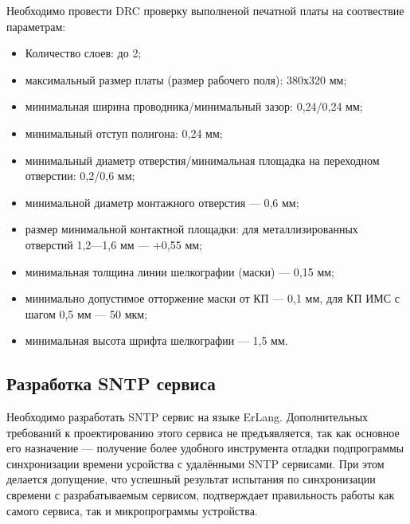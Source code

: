 \begin{par}
Необходимо провести DRC проверку выполненой печатной платы на соотвествие параметрам:
\begin{itemize}
    \item{} Количество слоев: до 2;
    \item{} максимальный размер платы (размер рабочего поля): 380х320 мм;
    \item{} минимальная ширина проводника/минимальный зазор: 0,24/0,24 мм;
    \item{} минимальный отступ полигона: 0,24 мм;
    \item{} минимальный диаметр отверстия/минимальная площадка на переходном отверстии: 0,2/0,6 мм;
    \item{} минимальной диаметр монтажного отверстия — 0,6 мм;
    \item{} размер минимальной контактной площадки: для металлизированных отверстий 1,2—1,6 мм — +0,55 мм;
    \item{} минимальная толщина линии шелкографии (маски) — 0,15 мм;
    \item{} минимально допустимое отторжение маски от КП — 0,1 мм, для КП ИМС с шагом 0,5 мм — 50 мкм;
    \item{} минимальная высота шрифта шелкографии — 1,5 мм.
\end{itemize}
\end{par}

\subsection{Разработка SNTP сервиса}
\begin{par}
Необходимо разработать SNTP сервис на языке ErLang. Дополнительных требований к проектированию этого сервиса
не предъявляется, так как основное его назначение --- получение более удобного
инструмента отладки подпрограммы синхронизации времени усройства с удалёнными SNTP сервисами.
При этом делается допущение, что успешный результат испытания по синхронизации свремени с разрабатываемым
сервисом, подтверждает правильность работы как самого сервиса, так и микропрограммы устройства.
\end{par}
\newpage{}
